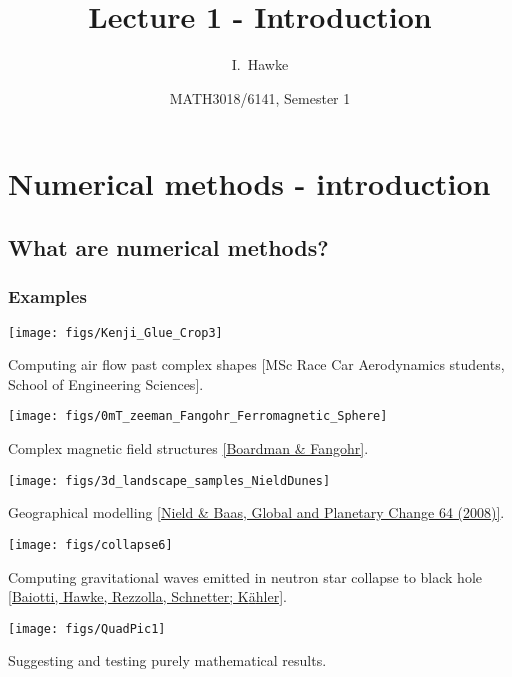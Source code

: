 \documentclass{beamer}
\title[Lecture 1]{Lecture 1 - Introduction}
\author[I. Hawke]{I.~Hawke}
\institute[University of Southampton]
{
  School of Mathematics, \\
  University of Southampton, UK
}
\date[Semester 1]{MATH3018/6141, Semester 1}
\begin{document}
\begin{frame}
  \titlepage
\end{frame}

\section{Numerical methods - introduction}

\subsection{What are numerical methods?}

\begin{frame}
  \frametitle{Examples}

  \begin{overlayarea}{\textwidth}{0.8\textheight}
    {
      \begin{center}

        \vspace{2ex}
        \texttt{[image: figs/Kenji\_Glue\_Crop3]}
        \vspace{3ex}

        Computing air flow past complex shapes {\tiny [MSc Race Car
          Aerodynamics students, School of Engineering Sciences]}.
      \end{center}
    }
    {
      \begin{center}
        \texttt{[image: figs/0mT\_zeeman\_Fangohr\_Ferromagnetic\_Sphere]}

        Complex magnetic field structures \href{http://www.soton.ac.uk/~rpb/thesis.pdf}{\tiny [Boardman \& Fangohr]}.
      \end{center}
    }
    {
      \begin{center}
        \texttt{[image: figs/3d\_landscape\_samples\_NieldDunes]}

        Geographical modelling {\tiny
          \href{http://dx.doi.org/10.1016/j.gloplacha.2008.10.002}{[Nield \&
            Baas, Global and Planetary Change 64 (2008)]}}.
      \end{center}
    }
    {
      \begin{center}
        \texttt{[image: figs/collapse6]}

        Computing gravitational waves emitted in neutron star collapse
        to black hole
        \href{http://dx.doi.org/10.1088/0264-9381/24/12/S13}{{\tiny
            [Baiotti, Hawke, Rezzolla, Schnetter; K{\"a}hler]}}.
      \end{center}
    }
    {
      \begin{center}
        \texttt{[image: figs/QuadPic1]}

        Suggesting and testing purely mathematical results.
      \end{center}
    }
  \end{overlayarea}

\end{frame}
\end{document}
